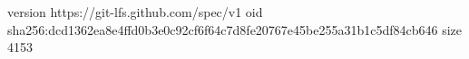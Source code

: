 version https://git-lfs.github.com/spec/v1
oid sha256:dcd1362ea8e4ffd0b3e0c92cf6f64c7d8fe20767e45be255a31b1c5df84cb646
size 4153
